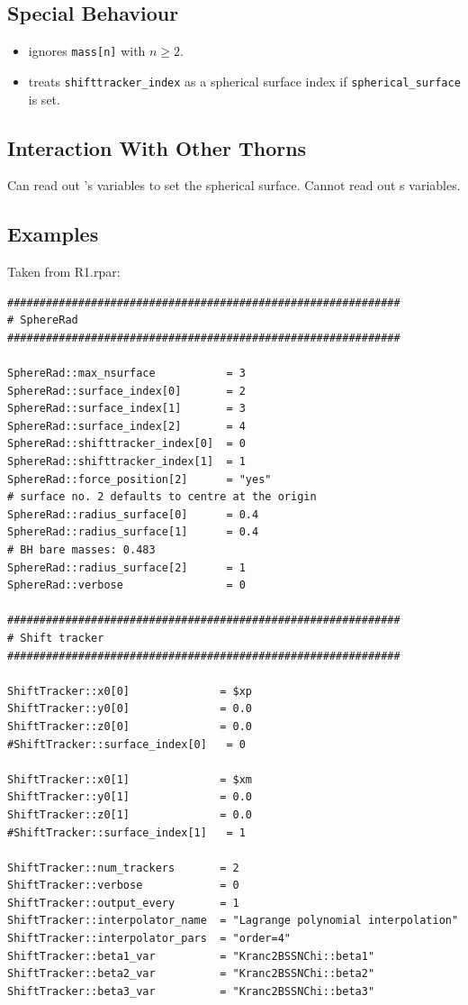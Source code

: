 \subsection{Special Behaviour}
\begin{itemize}
\item ignores \verb|mass[n]| with $n \ge 2$.
\item treats \verb|shifttracker_index| as a spherical surface index if
    \verb|spherical_surface| is set.
\end{itemize}

\subsection{Interaction With Other Thorns}
Can read out 's variables to set the spherical surface. Cannot
read out s variables.

\subsection{Examples}
Taken from R1.rpar:
\begin{verbatim}
#############################################################
# SphereRad
#############################################################

SphereRad::max_nsurface           = 3
SphereRad::surface_index[0]       = 2
SphereRad::surface_index[1]       = 3
SphereRad::surface_index[2]       = 4
SphereRad::shifttracker_index[0]  = 0
SphereRad::shifttracker_index[1]  = 1
SphereRad::force_position[2]      = "yes"
# surface no. 2 defaults to centre at the origin
SphereRad::radius_surface[0]      = 0.4
SphereRad::radius_surface[1]      = 0.4
# BH bare masses: 0.483
SphereRad::radius_surface[2]      = 1
SphereRad::verbose                = 0

#############################################################
# Shift tracker
#############################################################

ShiftTracker::x0[0]              = $xp
ShiftTracker::y0[0]              = 0.0
ShiftTracker::z0[0]              = 0.0
#ShiftTracker::surface_index[0]   = 0

ShiftTracker::x0[1]              = $xm
ShiftTracker::y0[1]              = 0.0
ShiftTracker::z0[1]              = 0.0
#ShiftTracker::surface_index[1]   = 1

ShiftTracker::num_trackers       = 2
ShiftTracker::verbose            = 0
ShiftTracker::output_every       = 1
ShiftTracker::interpolator_name  = "Lagrange polynomial interpolation"
ShiftTracker::interpolator_pars  = "order=4"
ShiftTracker::beta1_var          = "Kranc2BSSNChi::beta1"
ShiftTracker::beta2_var          = "Kranc2BSSNChi::beta2"
ShiftTracker::beta3_var          = "Kranc2BSSNChi::beta3"
\end{verbatim}

